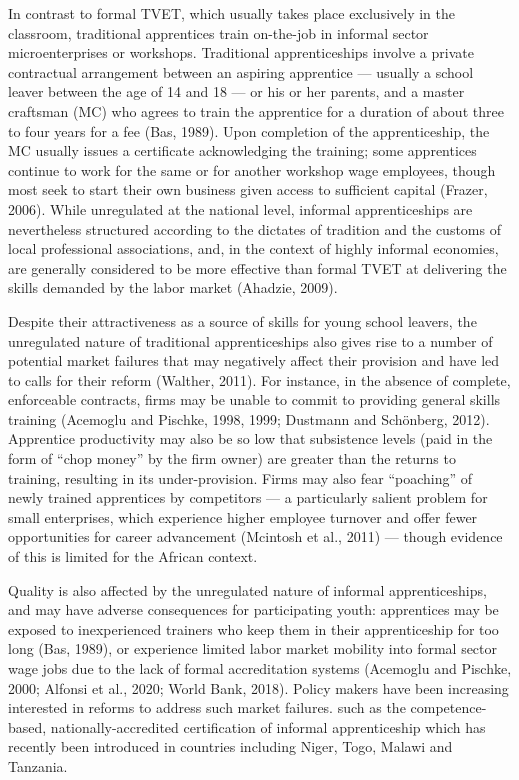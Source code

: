 \documentclass[
  11pt,
a4paper
]{report}
\begin{document}
In contrast to formal TVET, which usually takes place exclusively in the classroom, traditional apprentices train on-the-job in informal sector microenterprises or workshops. Traditional apprenticeships involve a private contractual arrangement between an aspiring apprentice --- usually a school leaver between the age of 14 and 18 --- or his or her parents, and a master craftsman (MC) who agrees to train the apprentice for a duration of about three to four years for a fee (Bas, 1989). Upon completion of the apprenticeship, the MC usually issues a certificate acknowledging the training; some apprentices continue to work for the same or for another workshop wage employees, though most seek to start their own business given access to sufficient capital (Frazer, 2006). While unregulated at the national level, informal apprenticeships are nevertheless structured according to the dictates of tradition and the customs of local professional associations, and, in the context of highly informal economies, are generally considered to be more effective than formal TVET at delivering the skills demanded by the labor market (Ahadzie, 2009).

Despite their attractiveness as a source of skills for young school leavers, the unregulated nature of traditional apprenticeships also gives rise to a number of potential market failures that may negatively affect their provision and have led to calls for their reform (Walther, 2011). For instance, in the absence of complete, enforceable contracts, firms may be unable to commit to providing general skills training (Acemoglu and Pischke, 1998, 1999; Dustmann and Schönberg, 2012). Apprentice productivity may also be so low that subsistence levels (paid in the form of ``chop money'' by the firm owner) are greater than the returns to training, resulting in its under-provision. Firms may also fear ``poaching'' of newly trained apprentices by competitors --- a particularly salient problem for small enterprises, which experience higher employee turnover and offer fewer opportunities for career advancement (Mcintosh et al., 2011) --- though evidence of this is limited for the African context.

Quality is also affected by the unregulated nature of informal apprenticeships, and may have adverse consequences for participating youth: apprentices may be exposed to inexperienced trainers who keep them in their apprenticeship for too long (Bas, 1989), or experience limited labor market mobility into formal sector wage jobs due to the lack of formal accreditation systems (Acemoglu and Pischke, 2000; Alfonsi et al., 2020; World Bank, 2018). Policy makers have been increasing interested in reforms to address such market failures. such as the competence-based, nationally-accredited certification of informal apprenticeship which has recently been introduced in countries including Niger, Togo, Malawi and Tanzania.
\end{document}
